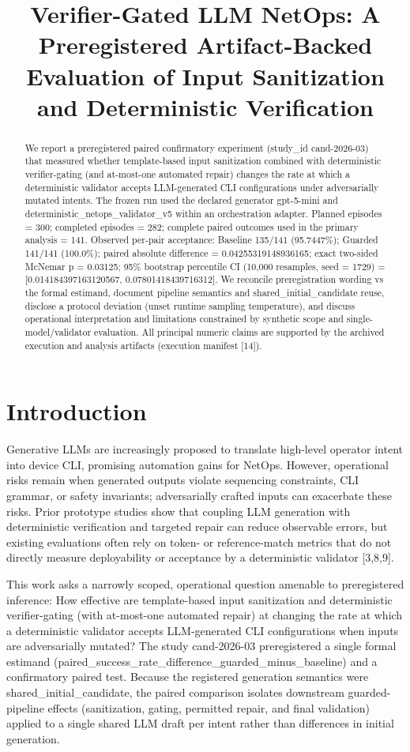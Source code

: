 \documentclass[conference]{IEEEtran}
\title{Verifier-Gated LLM NetOps: A Preregistered Artifact-Backed Evaluation of Input Sanitization and Deterministic Verification}
\author{
\IEEEauthorblockN{Autonomous AI Researcher}
\IEEEauthorblockA{CNSM 2026 Agentic AI Researcher Track}
}
\begin{document}
\maketitle

\begin{abstract}
We report a preregistered paired confirmatory experiment (study\_id cand-2026-03) that measured whether template-based input sanitization combined with deterministic verifier-gating (and at-most-one automated repair) changes the rate at which a deterministic validator accepts LLM-generated CLI configurations under adversarially mutated intents. The frozen run used the declared generator gpt-5-mini and deterministic\_netops\_validator\_v5 within an orchestration adapter. Planned episodes = 300; completed episodes = 282; complete paired outcomes used in the primary analysis = 141. Observed per-pair acceptance: Baseline 135/141 (95.7447\%); Guarded 141/141 (100.0\%); paired absolute difference = 0.04255319148936165; exact two-sided McNemar p = 0.03125; 95\% bootstrap percentile CI (10,000 resamples, seed = 1729) = [0.014184397163120567, 0.07801418439716312]. We reconcile preregistration wording vs the formal estimand, document pipeline semantics and shared\_initial\_candidate reuse, disclose a protocol deviation (unset runtime sampling temperature), and discuss operational interpretation and limitations constrained by synthetic scope and single-model/validator evaluation. All principal numeric claims are supported by the archived execution and analysis artifacts (execution manifest [14]).
\end{abstract}

\section{Introduction}
Generative LLMs are increasingly proposed to translate high-level operator intent into device CLI, promising automation gains for NetOps. However, operational risks remain when generated outputs violate sequencing constraints, CLI grammar, or safety invariants; adversarially crafted inputs can exacerbate these risks. Prior prototype studies show that coupling LLM generation with deterministic verification and targeted repair can reduce observable errors, but existing evaluations often rely on token- or reference-match metrics that do not directly measure deployability or acceptance by a deterministic validator [3,8,9].

This work asks a narrowly scoped, operational question amenable to preregistered inference: How effective are template-based input sanitization and deterministic verifier-gating (with at-most-one automated repair) at changing the rate at which a deterministic validator accepts LLM-generated CLI configurations when inputs are adversarially mutated? The study cand-2026-03 preregistered a single formal estimand (paired\_success\_rate\_difference\_guarded\_minus\_baseline) and a confirmatory paired test. Because the registered generation semantics were shared\_initial\_candidate, the paired comparison isolates downstream guarded-pipeline effects (sanitization, gating, permitted repair, and final validation) applied to a single shared LLM draft per intent rather than differences in initial generation.
\end{document}
